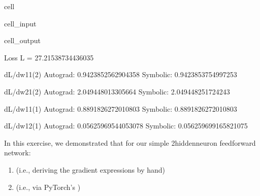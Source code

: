 \documentclass[letterpaper,10pt,english]{jupyterBook}
\begin{document}
\begin{sphinxuseclass}{cell}
\begin{sphinxVerbatimInput}
\begin{sphinxuseclass}{cell_input}
\begin{sphinxVerbatim}[commandchars=\\\{\}]
   
\end{sphinxVerbatim}

\end{sphinxuseclass}\end{sphinxVerbatimInput}
\begin{sphinxVerbatimOutput}

\begin{sphinxuseclass}{cell_output}
\begin{sphinxVerbatim}[commandchars=\\\{\}]
Loss L = 27.21538734436035

\PYGZhy{}\PYGZhy{}\PYGZhy{} dL/dw11\PYGZca{}(2) \PYGZhy{}\PYGZhy{}\PYGZhy{}
Auto\PYGZhy{}grad: 0.9423852562904358 	 Symbolic: 0.9423853754997253

\PYGZhy{}\PYGZhy{}\PYGZhy{} dL/dw21\PYGZca{}(2) \PYGZhy{}\PYGZhy{}\PYGZhy{}
Auto\PYGZhy{}grad: 2.049448013305664 	 Symbolic: 2.049448251724243

\PYGZhy{}\PYGZhy{}\PYGZhy{} dL/dw11\PYGZca{}(1) \PYGZhy{}\PYGZhy{}\PYGZhy{}
Auto\PYGZhy{}grad: \PYGZhy{}0.8891826272010803 	 Symbolic: \PYGZhy{}0.8891826272010803

\PYGZhy{}\PYGZhy{}\PYGZhy{} dL/dw12\PYGZca{}(1) \PYGZhy{}\PYGZhy{}\PYGZhy{}
Auto\PYGZhy{}grad: \PYGZhy{}0.05625969544053078 	 Symbolic: \PYGZhy{}0.056259699165821075
\end{sphinxVerbatim}

\end{sphinxuseclass}\end{sphinxVerbatimOutput}

\end{sphinxuseclass}
\sphinxAtStartPar
In this exercise, we demonstrated that for our simple 2\sphinxhyphen{}hidden\sphinxhyphen{}neuron feedforward network:
\begin{enumerate}
%
\item {} 
\sphinxAtStartPar
{} (i.e., deriving the gradient expressions by hand)

\item {} 
\sphinxAtStartPar
{} (i.e., via PyTorch’s )

\end{enumerate}
\end{document}
